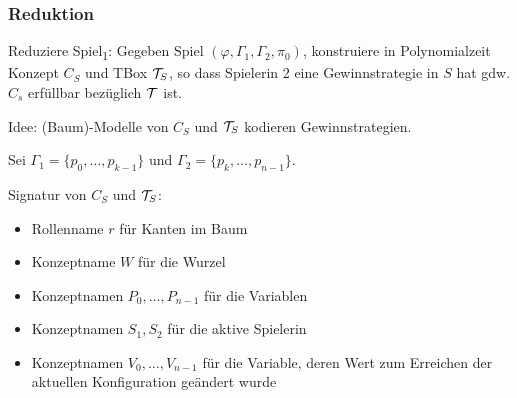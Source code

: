 \subsubsection{Reduktion}\label{reduktion}

Reduziere Spiel\textsubscript{1}: Gegeben Spiel
$\left( \varphi,\Gamma_1,\Gamma_2,\pi_{0} \right)$, konstruiere in
Polynomialzeit Konzept $C_{S}$ und TBox $\mathcal{T}_{S}$, so dass Spielerin 2 eine Gewinnstrategie in $S$ hat gdw. $C_s$ erfüllbar bezüglich $\mathcal{T}$ ist.

Idee: (Baum)-Modelle von $C_S$ und $\mathcal{T}_S$ kodieren Gewinnstrategien.

Sei $\Gamma_1 = \{p_0,\ldots,p_{k - 1}\}$ und $\Gamma_2 = \{p_k, \ldots, p_{n - 1}\}$.

Signatur von $C_S$ und $\mathcal{T}_S$:
\begin{itemize}
    \item Rollenname $r$ für Kanten im Baum
    \item Konzeptname $W$ für die Wurzel
    \item Konzeptnamen $P_0, \ldots, P_{n - 1}$ für die Variablen
    \item Konzeptnamen $S_1, S_2$ für die aktive Spielerin
    \item Konzeptnamen $V_0, \ldots, V_{n - 1}$ für die Variable, deren Wert zum Erreichen der aktuellen Konfiguration geändert wurde
\end{itemize}

